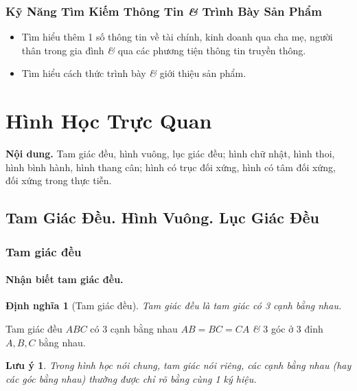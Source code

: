 \documentclass{article}
\numberwithin{equation}{section}
\newtheorem{definition}{Định nghĩa}[section]
\newtheorem{remark}{Lưu ý}[section]
\begin{document}
\subsubsection{Kỹ Năng Tìm Kiếm Thông Tin \textit{\&} Trình Bày Sản Phẩm}

\begin{itemize}
	\item Tìm hiểu thêm 1 số thông tin về tài chính, kinh doanh qua cha mẹ, người thân trong gia đình \textit{\&} qua các phương tiện thông tin truyền thông.
	\item Tìm hiểu cách thức trình bày \textit{\&} giới thiệu sản phẩm.
\end{itemize}


\section{Hình Học Trực Quan}
\textbf{Nội dung.} Tam giác đều, hình vuông, lục giác đều; hình chữ nhật, hình thoi, hình bình hành, hình thang cân; hình có trục đối xứng, hình có tâm đối xứng, đối xứng trong thực tiễn.

\subsection{Tam Giác Đều. Hình Vuông. Lục Giác Đều}

\subsubsection{Tam giác đều}

\paragraph{Nhận biết tam giác đều.}
\begin{definition}[Tam giác đều]
	\emph{Tam giác đều} là tam giác có 3 cạnh bằng nhau.
\end{definition}
Tam giác đều $ABC$ có 3 cạnh bằng nhau $AB = BC = CA$ \textit{\&} 3 góc ở 3 đỉnh $A,B,C$ bằng nhau.

\begin{remark}
	Trong hình học nói chung, tam giác nói riêng, các cạnh bằng nhau (hay các góc bằng nhau) thường được chỉ rõ bằng cùng 1 ký hiệu.
\end{remark}
\end{document}
